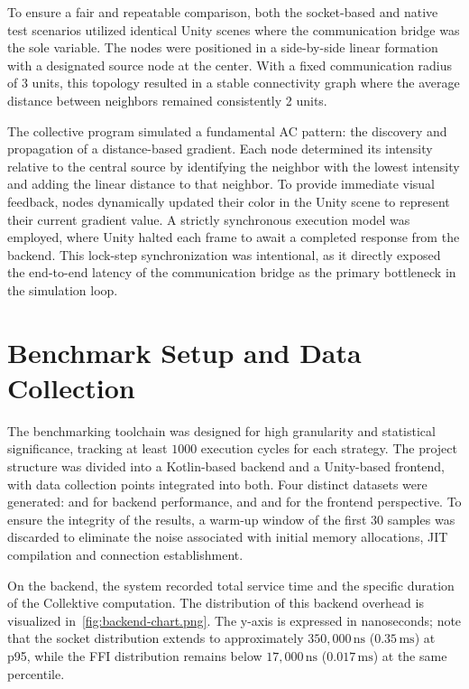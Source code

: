 To ensure a fair and repeatable comparison, both the socket-based and native test scenarios utilized identical Unity scenes where the communication bridge was the sole variable. The nodes were positioned in a side-by-side linear formation with a designated source node at the center. With a fixed communication radius of 3 units, this topology resulted in a stable connectivity graph where the average distance between neighbors remained consistently 2 units.

The collective program simulated a fundamental \ac{AC} pattern: the discovery and propagation of a distance-based gradient. Each node determined its intensity relative to the central source by identifying the neighbor with the lowest intensity and adding the linear distance to that neighbor. To provide immediate visual feedback, nodes dynamically updated their color in the Unity scene to represent their current gradient value. A strictly synchronous execution model was employed, where Unity halted each frame to await a completed response from the backend. This lock-step synchronization was intentional, as it directly exposed the end-to-end latency of the communication bridge as the primary bottleneck in the simulation loop.

\section{Benchmark Setup and Data Collection}

The benchmarking toolchain was designed for high granularity and statistical significance, tracking at least $1000$ execution cycles for each strategy. The project structure was divided into a Kotlin-based backend and a Unity-based frontend, with data collection points integrated into both. Four distinct datasets were generated:  and  for backend performance, and  and  for the frontend perspective. To ensure the integrity of the results, a warm-up window of the first $30$ samples was discarded to eliminate the noise associated with initial memory allocations, JIT compilation and connection establishment.

On the backend, the system recorded total service time and the specific duration of the Collektive computation. The distribution of this backend overhead is visualized in~\cref{fig:backend-chart.png}. The y-axis is expressed in nanoseconds; note that the socket distribution extends to approximately $350{,}000\,\text{ns}$ ($0.35\,\text{ms}$) at p95, while the \ac{FFI} distribution remains below $17{,}000\,\text{ns}$ ($0.017\,\text{ms}$) at the same percentile.

